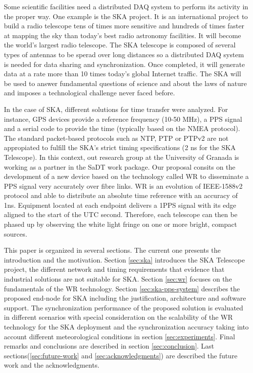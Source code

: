 Some scientific facilities need a distributed DAQ system to perform its activity in the proper way. One example is the SKA \cite{ska:project_website} project. It is an international project to build a radio telescope tens of times more sensitive and hundreds of times faster at mapping the sky than today's best radio astronomy facilities. It will become the world's largest radio telescope. The SKA telescope is composed of several types of antennas to be sperad over long distances so a distributed DAQ system is needed for data sharing and synchronization. Once completed, it will generate data at a rate more than 10 times today’s global Internet traffic. The SKA will be used to answer fundamental questions of science and about the laws of nature and imposes a technological challenge never faced before.

In the case of SKA, different solutions for time transfer were analyzed. For instance, GPS devices provide a reference frequency (10-50 MHz), a PPS signal and a serial code to provide the time (typically based on the NMEA protocol). The standard packet-based protocols such as NTP, PTP or PTPv2 are not appropiated to fulfill the SKA's strict timing specifications (2 ns for the SKA Telescope).
In this context, out research group at the University of Granada is working as a partner in the SaDT \cite{ska:sadt_website} work package. Our proposal consits on the development of a new device based on the technology called WR \cite{ohwr:wr_wiki} to disseminate a PPS signal very accurately over fibre links. WR is an evolution of IEEE-1588v2 protocol and able to distribute an absolute time reference with an accuracy of 1ns. Equipment located at each endpoint delivers a 1PPS signal with its edge aligned to the start of the UTC second. Therefore, each telescope can then be phased up by observing the white light fringe on one or more bright, compact sources.

This paper is organized in several sections. The current one 
presents the introduction and the motivation. Section \ref{sec:ska} introduces the SKA Telescope project, the different network and timing requirements that evidence that industrial solutions are not suitable for SKA. Section \ref{sec:wr} focuses on the fundamentals of the WR technology. Section \ref{sec:ska-pps-system} describes the proposed end-node for SKA including the justification, architecture and software support. The synchronization performance of the proposed solution is evaluated in different scenarios with special consideration on the scalability of the WR technology for the SKA deployment and the synchronization accuracy taking into account different meteorological conditions in section \ref{sec:experiments}. Final remarks and conclusions are described in section \ref{sec:conclusion}. Last sections(\ref{sec:future-work} and \ref{sec:acknowledgments}) are described the future work and the acknowledgments.


